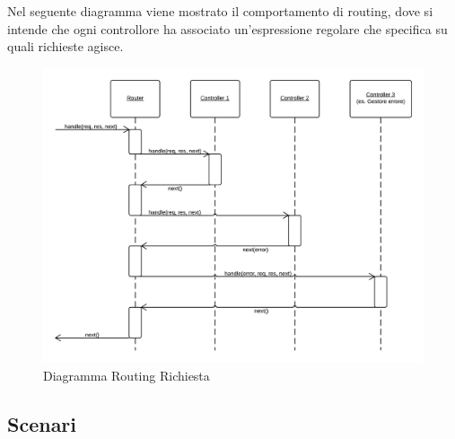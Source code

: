 Nel seguente diagramma viene mostrato il comportamento di routing, dove si intende che ogni controllore ha associato un'espressione regolare che specifica su quali richieste agisce. 
\begin{figure}[H]
	\begin{center} 
		\includegraphics[scale=0.27]{scenari/Diagramma Routing Richiesta.png} 
		\caption{Diagramma Routing Richiesta}
	\end{center} 
\end{figure}

\subsection{Scenari}

